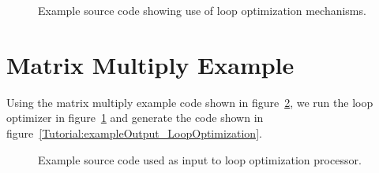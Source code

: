 \begin{figure}[!h]
{\indent
{\mySmallFontSize


\begin{latexonly}
   
\end{latexonly}

\begin{htmlonly}
   
\end{htmlonly}

}
}
\caption{Example source code showing use of loop optimization mechanisms.}
\label{Tutorial:exampleLoopOptimization}
\end{figure}

\clearpage
\section{Matrix Multiply Example}

   Using the matrix multiply example code shown in 
figure~\ref{Tutorial:exampleInputCode_LoopOptimization}, we run the loop optimizer in
figure~\ref{Tutorial:exampleLoopOptimization} and generate the code shown in 
figure~\ref{Tutorial:exampleOutput_LoopOptimization}.

\begin{figure}[!h]
{\indent
{\mySmallFontSize


\begin{latexonly}
   
\end{latexonly}

\begin{htmlonly}
   
\end{htmlonly}

}
}
\caption{Example source code used as input to loop optimization processor.}
\label{Tutorial:exampleInputCode_LoopOptimization}
\end{figure}

